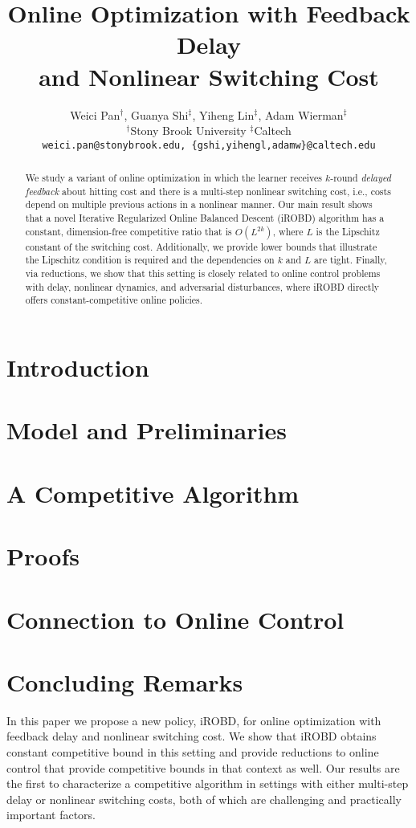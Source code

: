 \documentclass[11pt]{article}
\date{}
\title{Online Optimization with Feedback Delay \\and Nonlinear Switching Cost}
\author{
 Weici Pan$^\dagger$, Guanya Shi$^\ddagger$, Yiheng Lin$^\ddagger$, Adam Wierman$^\ddagger$ \\
  $^\dagger$Stony Brook University \; $^\ddagger$Caltech \\
  \texttt{weici.pan@stonybrook.edu, \{gshi,yihengl,adamw\}@caltech.edu} 
}
\theoremstyle{definition}
\begin{document}
\maketitle

\begin{abstract}
 We study a variant of online optimization in which the learner receives $k$-round \textit{delayed feedback} about hitting cost and there is a multi-step nonlinear switching cost, i.e., costs depend on multiple previous actions in a nonlinear manner. Our main result shows that a novel Iterative Regularized Online Balanced Descent (iROBD) algorithm has a constant, dimension-free competitive ratio that is $O(L^{2k})$, where $L$ is the Lipschitz constant of the switching cost. Additionally, we provide lower bounds that illustrate the Lipschitz condition is required and the dependencies on $k$ and $L$ are tight. Finally, via reductions, we show that this setting is closely related to online control problems with delay, nonlinear dynamics, and adversarial disturbances, where iROBD directly offers constant-competitive online policies.
\end{abstract}

\section{Introduction}


\section{Model and Preliminaries}


\section{A Competitive Algorithm}\label{Algorithm}


\section{Proofs}\label{proofs}


\section{Connection to Online Control}\label{Control}



\section{Concluding Remarks}
\label{conclusion}
In this paper we propose a new policy, iROBD, for online optimization with feedback delay and nonlinear switching cost.  We show that iROBD obtains constant competitive bound in this setting and provide reductions to online control that provide competitive bounds in that context as well.  Our results are the first to characterize a competitive algorithm in settings with either multi-step delay or nonlinear switching costs, both of which are challenging and practically important factors.
\end{document}
